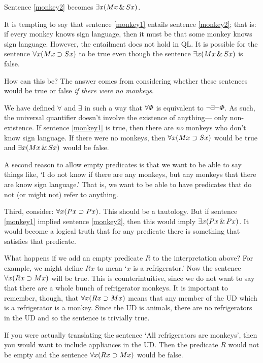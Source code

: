 Sentence \ref{monkey2} becomes $\exists x(Mx \,\&\, Sx)$.

It is tempting to say that sentence \ref{monkey1} entails sentence \ref{monkey2}; that is: if every monkey knows sign language, then it must be that some monkey knows sign language. However, the entailment does not hold in QL. It is possible for the sentence $\forall x(Mx \supset Sx)$ to be true even though the sentence $\exists x(Mx \,\&\, Sx)$ is false.

How can this be? The answer comes from considering whether these sentences would be true or false \emph{if there were no monkeys}.

We have defined $\forall$ and $\exists$ in such a way that $\forall\varPhi{}$ is equivalent to $\neg \exists\neg \varPhi{}$. As such, the universal quantifier doesn't involve the existence of anything--- only non-existence. If sentence \ref{monkey1} is true, then there are \emph{no} monkeys who don't know sign language. If there were no monkeys, then $\forall x(Mx \supset Sx)$ would be true and $\exists x(Mx \,\&\, Sx)$ would be false.

A second reason to allow empty predicates is that we want to be able to say things like, `I do not know if there are any monkeys, but any monkeys that there are know sign language.' That is, we want to be able to have predicates that do not (or might not) refer to anything.

Third, consider: $\forall x (Px \supset Px)$. This should be a tautology. But if sentence \ref{monkey1} implied sentence \ref{monkey2}, then this would imply $\exists x (Px \,\&\, Px)$. It would become a logical truth that for any predicate there is something that satisfies that predicate.

What happens if we add an empty predicate $R$ to the interpretation above? For example, we might define $Rx$ to mean `$x$ is a refrigerator.' Now the sentence $\forall x(Rx \supset Mx)$ will be true. This is counterintuitive, since we do not want to say that there are a whole bunch of refrigerator monkeys. It is important to remember, though, that $\forall x(Rx \supset Mx)$ means that any member of the UD which is a refrigerator is a monkey. Since the UD is animals, there are no refrigerators in the UD and so the sentence is trivially true.

If you were actually translating the sentence `All refrigerators are monkeys', then you would want to include appliances in the UD. Then the predicate $R$ would not be empty and the sentence $\forall x(Rx \supset Mx)$ would be false.

